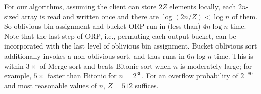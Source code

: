 For our algorithms, assuming the client can store $2Z$ elements locally, each $2n$-sized array is read and written once and there are $\log(2n/Z)<\log n$ of them.
So oblivious bin assignment and bucket ORP run in (less than) $4n\log n$ time.
Note that the last step of ORP, i.e., permuting each output bucket, can be incorporated with the last level of oblivious bin assignment.
Bucket oblivious sort additionally invokes a non-oblivious sort, and thus runs in $6n\log n$ time. 
This is within $3\times$ of Merge sort and beats Bitonic sort when $n$ is moderately large;
for example, $5\times$ faster than Bitonic for $n=2^{30}$.
For an overflow probability of $2^{-80}$ and most reasonable values of $n$, $Z = 512$ suffices. 



